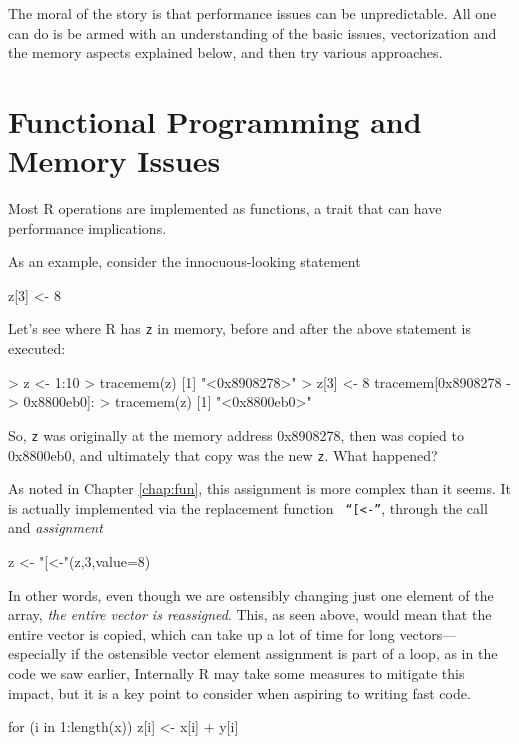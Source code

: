 The moral of the story is that performance issues can be unpredictable.
All one can do is be armed with an understanding of the basic issues,
vectorization and the memory aspects explained below, and then try
various approaches.

\section{Functional Programming and Memory Issues}
\label{func}

Most R operations are implemented as functions, a trait that can have
performance implications.

As an example, consider the innocuous-looking statement

\begin{Code}
z[3] <- 8
\end{Code}

\noindent
Let's see where R has {\tt z} in memory, before and after the above
statement is executed:

\begin{Code}
> z <- 1:10
> tracemem(z)
[1] "<0x8908278>"
> z[3] <- 8
tracemem[0x8908278 -> 0x8800eb0]: 
> tracemem(z)
[1] "<0x8800eb0>"
\end{Code}

\noindent
So, {\tt z} was originally at the memory address 0x8908278, then was
copied to 0x8800eb0, and ultimately that copy was the new {\tt z}.  What
happened?

As noted in Chapter \ref{chap:fun}, this assignment is more complex than
it seems.  It is actually implemented via the replacement function {\tt
``[$<$-''}, through the call and {\it assignment}

\begin{Code}
z <- "[<-"(z,3,value=8)
\end{Code}

\noindent
In other words, even though we are ostensibly changing just one element
of the array, {\it the entire vector is reassigned}.  This, as seen
above, would mean that the entire vector is copied, which can take up a
lot of time for long vectors---especially if the ostensible vector 
element assignment is part of a loop, as in the code we saw earlier,
Internally R may take some measures to mitigate this impact, but it is a
key point to consider when aspiring to writing fast code.

\begin{Code}
for (i in 1:length(x)) z[i] <- x[i] + y[i]
\end{Code}

